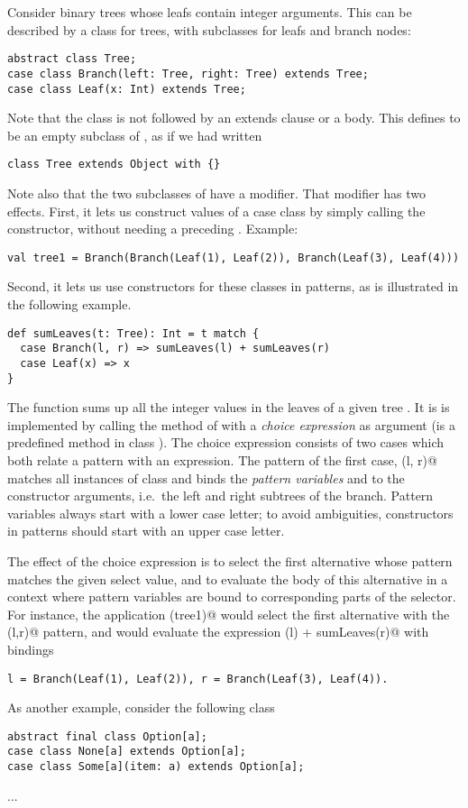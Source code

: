 \documentclass[11pt]{report}
\begin{document}
Consider binary trees whose leafs contain integer arguments. This can
be described by a class for trees, with subclasses for leafs and
branch nodes:
\begin{verbatim}
abstract class Tree;
case class Branch(left: Tree, right: Tree) extends Tree;
case class Leaf(x: Int) extends Tree;
\end{verbatim}
Note that the class \verb@Tree@ is not followed by an extends
clause or a body. This defines \verb@Tree@ to be an empty
subclass of \verb@Object@, as if we had written
\begin{verbatim}
class Tree extends Object with {}
\end{verbatim}
Note also that the two subclasses of \verb@Tree@ have a \verb@case@
modifier.  That modifier has two effects. First, it lets us construct
values of a case class by simply calling the constructor, without
needing a preceding \verb@new@. Example:
\begin{verbatim}
val tree1 = Branch(Branch(Leaf(1), Leaf(2)), Branch(Leaf(3), Leaf(4)))
\end{verbatim}
Second, it lets us use constructors for these classes in patterns, as
is illustrated in the following example.
\begin{verbatim}
def sumLeaves(t: Tree): Int = t match {
  case Branch(l, r) => sumLeaves(l) + sumLeaves(r)
  case Leaf(x) => x
}
\end{verbatim}
The function \verb@sumLeaves@ sums up all the integer values in the
leaves of a given tree \verb@t@. It is is implemented by calling the
\verb@match@ method of \verb@t@ with a {\em choice expression} as
argument (\verb@match@ is a predefined method in class \verb@Object@).
The choice expression consists of two cases which both
relate a pattern with an expression. The pattern of the first case,
\verb@Branch(l, r)@ matches all instances of class \verb@Branch@
and binds the {\em pattern variables} \verb@l@ and \verb@r@ to the
constructor arguments, i.e.\ the left and right subtrees of the
branch.  Pattern variables always start with a lower case letter; to
avoid ambiguities, constructors in patterns should start with an upper
case letter.

The effect of the choice expression is to select the first alternative
whose pattern matches the given select value, and to evaluate the body
of this alternative in a context where pattern variables are bound to
corresponding parts of the selector. For instance, the application
\verb@sumLeaves(tree1)@ would select the first alternative with the
\verb@Branch(l,r)@ pattern, and would evaluate the expression
\verb@sumLeaves(l) + sumLeaves(r)@ with bindings
\begin{verbatim}
l = Branch(Leaf(1), Leaf(2)), r = Branch(Leaf(3), Leaf(4)).
\end{verbatim}
As another example, consider the following class
\begin{verbatim}
abstract final class Option[a];
case class None[a] extends Option[a];
case class Some[a](item: a) extends Option[a];
\end{verbatim}
...
\end{document}
